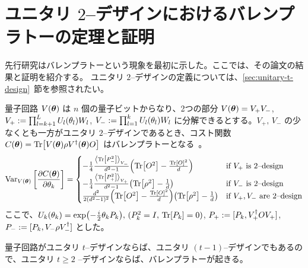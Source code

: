 \section{ユニタリ $2$--デザインにおけるバレンプラトーの定理と証明}\label{sec:bp-proof}
先行研究\cite{mcclean2018barren}はバレンプラトーという現象を最初に示した。ここでは、その論文の結果と証明を紹介する。
ユニタリ $2$--デザインの定義については、\ref{sec:unitary-t-design}~節を参照されたい。
\begin{screen}
    \begin{theorem}\label{thm:bp}
        量子回路 $V(\boldsymbol{\theta})$ は $n$ 個の量子ビットからなり、2つの部分 $V(\boldsymbol{\theta}) = V_+V_-$, $V_+ := \prod_{l=k+1}^L U_l(\theta_l)W_l$, $V_- := \prod_{l=1}^{k} U_l(\theta_l)W_l$ に分解できるとする。$V_+,\, V_-$ の少なくとも一方がユニタリ $2$--デザインであるとき、コスト関数 $C(\boldsymbol{\theta}) = \Tr[V(\boldsymbol{\theta})\rho V^\dagger(\boldsymbol{\theta})O]$ はバレンプラトーとなる~\cite{mcclean2018barren}。
        \begin{align}
            \Var_{V(\bs{\th})}\qty[\pdv{C(\bs{\th})}{\th_k}]
            =
            \begin{cases}
                -\frac{1}{4}\frac{\ev{\Tr[P_-^2]}_{V_-}}{d^2-1}\qty(\Tr[O^2] - \frac{\Tr[O]^2}{d}) & \text{if $V_+$ is $2$--design}\\
                -\frac{1}{4}\frac{\ev{\Tr[P_+^2]}_{V_+}}{d^2-1}\qty(\Tr[\rho^2] - \frac1d) & \text{if $V_-$ is $2$--design}\\
                \frac{d^2}{2(d^2-1)^2}\qty(\Tr[O^2] - \frac{\Tr[O]^2}{d})\qty(\Tr[\rho^2] - \frac1d) & \text{if $V_+,V_-$ are $2$--design}
            \end{cases}
        \end{align}
        ここで、$U_k(\theta_k) = \exp(-\frac{i}{2}\theta_k P_k),\,(P_k^2 = I,\, \Tr[P_k] = 0)$, $P_+ := [P_k, V_+^\dagger OV_+]$, $P_- := [P_k, V_-\rho V_-^\dagger]$ とした。
    \end{theorem}
\end{screen}

量子回路がユニタリ $t$--デザインならば、ユニタリ $(t-1)$--デザインでもあるので、ユニタリ $t \geq 2$ --デザインならば、バレンプラトーが起きる。


